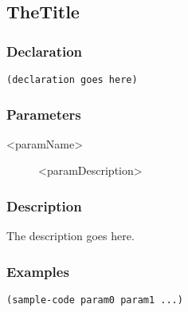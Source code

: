 \subsection{TheTitle}
\label{<key>}

\subsubsection*{Declaration}
\begin{lstlisting}
(declaration goes here)
\end{lstlisting}

\subsubsection*{Parameters}
\begin{description}
	\item[<paramName>] <paramDescription>
\end{description}

\subsubsection*{Description}
The description goes here.

\subsubsection{Examples}
\begin{lstlisting}
(sample-code param0 param1 ...)
\end{lstlisting}
